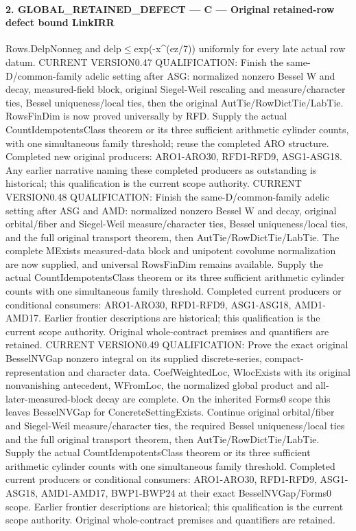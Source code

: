 \documentclass[11pt,a4paper]{article}
\numberwithin{equation}{section}
\theoremstyle{remark}\newtheorem{remark}[theorem]{Remark}
\begin{document}
\paragraph{2. GLOBAL\_\allowbreak RETAINED\_\allowbreak DEFECT — C — Original retained-row defect bound LinkIRR}

Rows.DelpNonneg and delp$\le$exp(-x\textasciicircum{}(ez/7)) uniformly for every late actual row datum. CURRENT VERSION0.47 QUALIFICATION: Finish the same-D/common-family adelic setting after ASG: normalized nonzero Bessel W and decay, measured-field block, original Siegel-Weil rescaling and measure/character ties, Bessel uniqueness/local ties, then the original AutTie/RowDictTie/LabTie. RowsFinDim is now proved universally by RFD. Supply the actual CountIdempotentsClass theorem or its three sufficient arithmetic cylinder counts, with one simultaneous family threshold; reuse the completed ARO structure. Completed new original producers: ARO1-ARO30, RFD1-RFD9, ASG1-ASG18. Any earlier narrative naming these completed producers as outstanding is historical; this qualification is the current scope authority. CURRENT VERSION0.48 QUALIFICATION: Finish the same-D/common-family adelic setting after ASG and AMD: normalized nonzero Bessel W and decay, original orbital/fiber and Siegel-Weil measure/character ties, Bessel uniqueness/local ties, and the full original transport theorem, then AutTie/RowDictTie/LabTie. The complete MExists measured-data block and unipotent covolume normalization are now supplied, and universal RowsFinDim remains available. Supply the actual CountIdempotentsClass theorem or its three sufficient arithmetic cylinder counts with one simultaneous family threshold. Completed current producers or conditional consumers: ARO1-ARO30, RFD1-RFD9, ASG1-ASG18, AMD1-AMD17. Earlier frontier descriptions are historical; this qualification is the current scope authority. Original whole-contract premises and quantifiers are retained. CURRENT VERSION0.49 QUALIFICATION: Prove the exact original BesselNVGap nonzero integral on its supplied discrete-series, compact-representation and character data. CoefWeightedLoc, WlocExists with its original nonvanishing antecedent, WFromLoc, the normalized global product and all-later-measured-block decay are complete. On the inherited Forms0 scope this leaves BesselNVGap for ConcreteSettingExists. Continue original orbital/fiber and Siegel-Weil measure/character ties, the required Bessel uniqueness/local ties and the full original transport theorem, then AutTie/RowDictTie/LabTie. Supply the actual CountIdempotentsClass theorem or its three sufficient arithmetic cylinder counts with one simultaneous family threshold. Completed current producers or conditional consumers: ARO1-ARO30, RFD1-RFD9, ASG1-ASG18, AMD1-AMD17, BWP1-BWP24 at their exact BesselNVGap/Forms0 scope. Earlier frontier descriptions are historical; this qualification is the current scope authority. Original whole-contract premises and quantifiers are retained.
\end{document}
